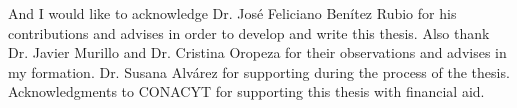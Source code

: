 
\begin{acknowledgements}      
And I would like to acknowledge Dr. Jos\'e Feliciano Ben\'itez Rubio for his contributions and advises in order to develop  and write this thesis. Also thank Dr. Javier Murillo and  Dr. Cristina Oropeza for their observations and advises in my formation. 
Dr. Susana Alv\'arez for supporting during the process of the thesis. Acknowledgments to CONACYT for supporting this thesis with financial aid. 
\end{acknowledgements}
